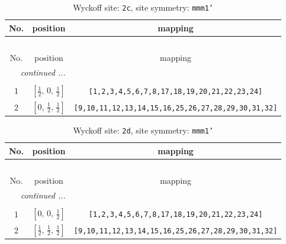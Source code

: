 \documentclass[fleqn,8pt]{jsarticle}
\begin{document}
\renewcommand{\arraystretch}{1.2}
\begin{longtable}{ccc}
\caption{Wyckoff site: {\tt 2c}, site symmetry: {\tt mmm1'}}
 \\
 \hline \hline
No. & position & mapping \\ \hline \endfirsthead

\multicolumn{2}{l}{\tablename\ \thetable{}} \\
 \hline \hline
No. & position & mapping \\ \hline \endhead

 \hline \hline
\multicolumn{2}{r}{\footnotesize\it continued ...} \\ \endfoot

 \hline \hline
\multicolumn{2}{r}{} \\ \endlastfoot

1 & $\left[ \frac{1}{2},\, 0,\, \frac{1}{2} \right]$ & {\tt [1,2,3,4,5,6,7,8,17,18,19,20,21,22,23,24]} \\ \hline
2 & $\left[ 0,\, \frac{1}{2},\, \frac{1}{2} \right]$ & {\tt [9,10,11,12,13,14,15,16,25,26,27,28,29,30,31,32]} \\
\end{longtable}
\renewcommand{\arraystretch}{1.2}
\begin{longtable}{ccc}
\caption{Wyckoff site: {\tt 2d}, site symmetry: {\tt mmm1'}}
 \\
 \hline \hline
No. & position & mapping \\ \hline \endfirsthead

\multicolumn{2}{l}{\tablename\ \thetable{}} \\
 \hline \hline
No. & position & mapping \\ \hline \endhead

 \hline \hline
\multicolumn{2}{r}{\footnotesize\it continued ...} \\ \endfoot

 \hline \hline
\multicolumn{2}{r}{} \\ \endlastfoot

1 & $\left[ 0,\, 0,\, \frac{1}{2} \right]$ & {\tt [1,2,3,4,5,6,7,8,17,18,19,20,21,22,23,24]} \\ \hline
2 & $\left[ \frac{1}{2},\, \frac{1}{2},\, \frac{1}{2} \right]$ & {\tt [9,10,11,12,13,14,15,16,25,26,27,28,29,30,31,32]} \\
\end{longtable}
\renewcommand{\arraystretch}{1.2}
\end{document}
